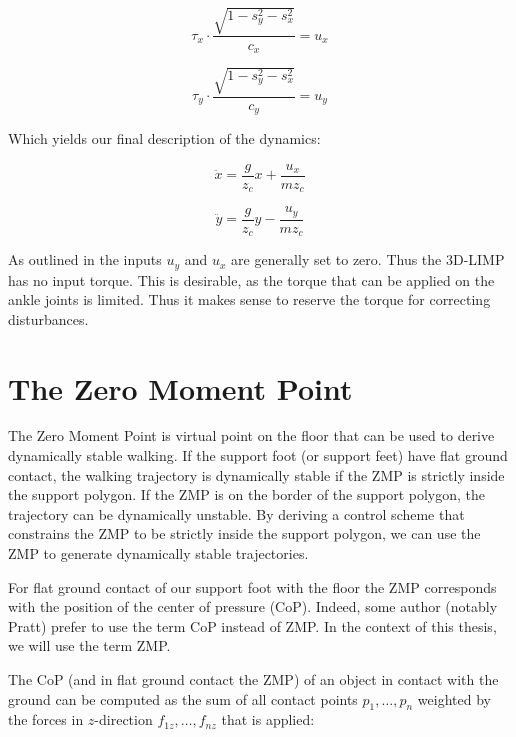 \documentclass[english,ngerman]{KITreprt}
\begin{document}
\begin{equation}
\tau_x \cdot \frac{\sqrt{1 - s_y^2 - s_x^2}}{c_x} = u_x
\end{equation}

\begin{equation}
\tau_y \cdot \frac{\sqrt{1 - s_y^2 - s_x^2}}{c_y} = u_y
\end{equation}

Which yields our final description of the dynamics:

\begin{equation} \label{eq:lip-x}
\ddot{x} = \frac{g}{z_c} x + \frac{u_x}{m z_c}
\end{equation}

\begin{equation} \label{eq:lip-y}
\ddot{y} = \frac{g}{z_c} y - \frac{u_y}{m z_c}
\end{equation}

As outlined in \cite{kajita20013d} the inputs $u_y$ and $u_x$ are
generally set to zero. Thus the 3D-LIMP has no input torque. This is
desirable, as the torque that can be applied on the ankle joints is
limited. Thus it makes sense to reserve the torque for correcting
disturbances.

\section{The Zero Moment Point}\label{the-zero-moment-point}

The Zero Moment Point is virtual point on the floor that can be used to
derive dynamically stable walking. If the support foot (or support feet)
have flat ground contact, the walking trajectory is dynamically stable
if the ZMP is strictly inside the support polygon. If the ZMP is on the
border of the support polygon, the trajectory can be dynamically
unstable. By deriving a control scheme that constrains the ZMP to be
strictly inside the support polygon, we can use the ZMP to generate
dynamically stable trajectories.

For flat ground contact of our support foot with the floor the ZMP
corresponds with the position of the center of pressure (CoP). Indeed,
some author (notably Pratt) prefer to use the term CoP instead of ZMP.
In the context of this thesis, we will use the term ZMP.

The CoP (and in flat ground contact the ZMP) of an object in contact
with the ground can be computed as the sum of all contact points
$p_1, \dots, p_n$ weighted by the forces in $z$-direction
$f_{1z}, \dots, f_{nz}$ that is applied:
\end{document}
